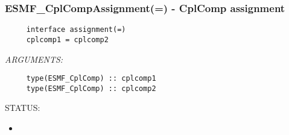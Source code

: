 
\setlength{\oldparskip}{\parskip}
\setlength{\parskip}{1.5ex}
\setlength{\oldparindent}{\parindent}
\setlength{\parindent}{0pt}
\setlength{\oldbaselineskip}{\baselineskip}
\setlength{\baselineskip}{11pt}
 
\def\bv{\begin{verbatim}}
\def\ev{\end{verbatim}}
\def\be{\begin{equation}}
\def\ee{\end{equation}}
\def\bea{\begin{eqnarray}}
\def\eea{\end{eqnarray}}
\def\bi{\begin{itemize}}
\def\ei{\end{itemize}}
\def\bn{\begin{enumerate}}
\def\en{\end{enumerate}}
\def\bd{\begin{description}}
\def\ed{\end{description}}
\def\({\left (}
\def\){\right )}
\def\[{\left [}
\def\]{\right ]}
\def\<{\left  \langle}
\def\>{\right \rangle}
\def\cI{{\cal I}}
\def\diag{\mathop{\rm diag}}
\def\tr{\mathop{\rm tr}}


 
\subsubsection [ESMF\_CplCompAssignment(=)] {ESMF\_CplCompAssignment(=) - CplComp assignment}


  
\begin{verbatim}     interface assignment(=)
     cplcomp1 = cplcomp2\end{verbatim}{\em ARGUMENTS:}
\begin{verbatim}     type(ESMF_CplComp) :: cplcomp1
     type(ESMF_CplComp) :: cplcomp2\end{verbatim}
{\sf STATUS:}
   \begin{itemize}
   \item{}
   \end{itemize}
  
